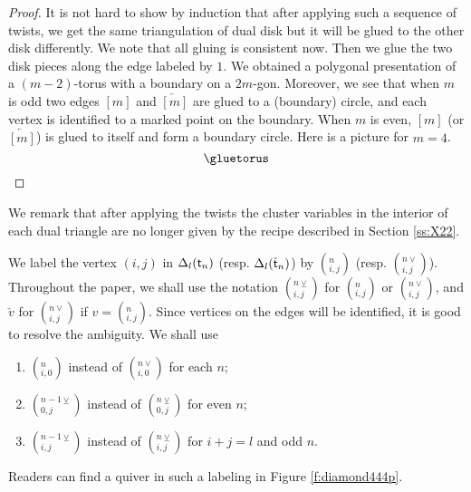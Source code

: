 \documentclass{amsart}
\theoremstyle{definition}
\theoremstyle{remark}
\numberwithin{equation}{section}
\renewcommand{\t}{{\sf t}}
\newcommand{\ijn}{_{i,j}^{n}}
\begin{document}
\begin{proof} It is not hard to show by induction that after applying such a sequence of twists, 
	we get the same triangulation of dual disk but it will be glued to the other disk differently.
	We note that all gluing is consistent now. 
	Then we glue the two disk pieces along the edge labeled by $1$.
	We obtained a polygonal presentation of a $(m-2)$-torus with a boundary on a $2m$-gon.
	Moreover, we see that when $m$ is odd two edges $[m]$ and $\overleftarrow{[m]}$ are glued to a (boundary) circle, 
	and each vertex is identified to a marked point on the boundary.
	When $m$ is even, $[m]$ (or $\overleftarrow{[m]}$) is glued to itself and form a boundary circle.
	Here is a picture for $m=4$.
	$$\gluetorus$$
\end{proof}
\noindent We remark that after applying the twists the cluster variables in the interior of each dual triangle are no longer given by the recipe described in Section \ref{ss:X22}.



We label the vertex $(i,j)$ in $\Delta_l(\t_n)$ (resp. $\Delta_l(\check{\t}_n)$) by $(\ijn)$ (resp. $(_{i,j}^{n\vee})$).
Throughout the paper, we shall use the notation $(_{i,j}^{n\veebar})$ for $(_{i,j}^{n})$ or $(_{i,j}^{n\vee})$, and $\check{v}$ for $(_{i,j}^{n\vee})$ if $v=(_{i,j}^{n})$.
Since vertices on the edges will be identified, it is good to resolve the ambiguity.
We shall use \begin{enumerate}
	\item $(_{i,0}^n)$ instead of $(_{i,0}^{n\vee})$ for each $n$;
	\item $(_{0,j}^{n-1\veebar})$ instead of $(_{0,j}^{n\veebar})$ for even $n$;
	\item $(_{i,j}^{n-1\veebar})$ instead of $(_{i,j}^{n\veebar})$ for $i+j=l$ and odd $n$.
\end{enumerate}
\noindent Readers can find a quiver in such a labeling in Figure \ref{f:diamond444p}.
\end{document}
